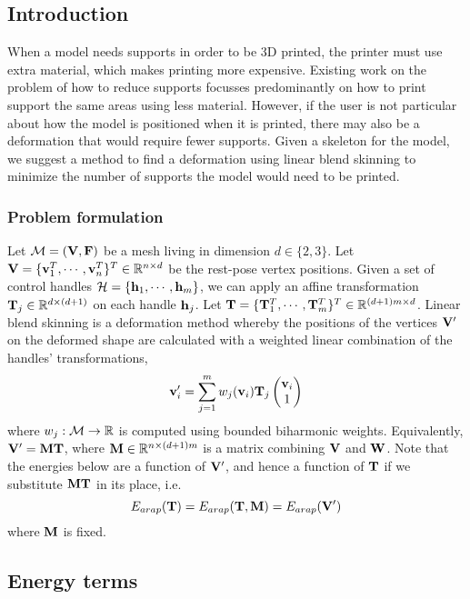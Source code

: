 
\subsection*{Introduction}


 
When a model needs supports in order to be 3D printed, the printer must use extra material, which makes printing more expensive. Existing work on the problem of how to reduce supports focusses predominantly on how to print support the same areas using less material. However, if the user is not particular about how the model is positioned when it is printed, there may also be a deformation that would require fewer supports. Given a skeleton for the model, we suggest a method to find a deformation using linear blend skinning to minimize the number of supports the model would need to be printed.

\subsubsection*{Problem formulation}
Let $\mathcal{M} = (\mathbf{V}, \mathbf{F})$ be a mesh living in dimension $d\in \{2,3\}$. Let $\mathbf{V} = \{\mathbf{v}_1^T, \cdots, \mathbf{v}_n^T\}^T \in \mathbb{R}^{n \times d}$ be the rest-pose vertex positions. Given a set of control handles $\mathcal{H} = \{ \mathbf{h}_1, \cdots, \mathbf{h}_m \}$, we can apply an affine transformation $\mathbf{T}_j \in \mathbb{R}^{d \times (d+1)}$ on each handle $\mathbf{h}_j$. Let $\mathbf{T} = \{ \mathbf{T}_1^T, \cdots, \mathbf{T}_m^T \}^T \in \mathbb{R}^{(d+1)m \times d}$. Linear blend skinning is a deformation method whereby the positions of the vertices $\mathbf{V}'$ on the deformed shape are calculated with a weighted linear combination of the handles' transformations,
\[
    \mathbf{v}_i' = \sum_{j=1}^m w_j(\mathbf{v}_i) \mathbf{T}_j 
    \begin{pmatrix} 
    \mathbf{v}_i \\
    1 
    \end{pmatrix} 
\]
where $w_j: \mathcal{M} \rightarrow \mathbb{R}$ is computed using bounded biharmonic weights. Equivalently, $\mathbf{V}' = \mathbf{M} \mathbf{T}$, where $\mathbf{M} \in \mathbb{R}^{n \times (d+1)m}$ is a matrix combining $\mathbf{V}$ and $\mathbf{W}$. Note that the energies below are a function of $\mathbf{V}'$, and hence a function of $\mathbf{T}$ if we substitute $\mathbf{M} \mathbf{T}$ in its place, i.e. 
\[
    E_{arap}(\mathbf{T}) = E_{arap}(\mathbf{T}, \mathbf{M}) = E_{arap}(\mathbf{V}')
\]
where $\mathbf{M}$ is fixed.

\subsection*{Energy terms} 

